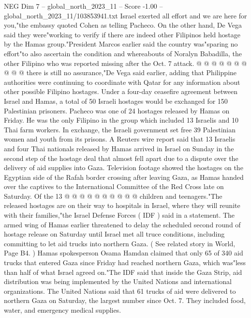 \begin{textsample}{NEG Dim 7 – global\_north\_2023\_11 – Score -1.00 – global\_north\_2023\_11/103853941.txt}
Israel exerted all effort and we are here for you,"the embassy quoted Cohen as telling Pacheco.
On the other hand, De Vega said they were"working to verify if there are indeed other Filipinos held hostage by the Hamas group."President Marcos earlier said the country was"sparing no effort"to also ascertain the condition and whereabouts of Noralyn Babadilla, the other Filipino who was reported missing after the Oct. 7 attack. @ @ @ @ @ @ @ @ @ @ there is still no assurance,"De Vega said earlier, adding that Philippine authorities were continuing to coordinate with Qatar for any information about other possible Filipino hostages.
Under a four-day ceasefire agreement between Israel and Hamas, a total of 50 Israeli hostages would be exchanged for 150 Palestinian prisoners.
Pacheco was one of 24 hostages released by Hamas on Friday.
He was the only Filipino in the group which included 13 Israelis and 10 Thai farm workers.
In exchange, the Israeli government set free 39 Palestinian women and youth from its prisons.
A Reuters wire report said that 13 Israelis and four Thai nationals released by Hamas arrived in Israel on Sunday in the second step of the hostage deal that almost fell apart due to a dispute over the delivery of aid supplies into Gaza.
Television footage showed the hostages on the Egyptian side of the Rafah border crossing after leaving Gaza, as Hamas handed over the captives to the International Committee of the Red Cross late on Saturday.
Of the 13 @ @ @ @ @ @ @ @ @ @ children and teenagers."The released hostages are on their way to hospitals in Israel, where they will reunite with their families,"the Israel Defense Forces ( IDF ) said in a statement.
The armed wing of Hamas earlier threatened to delay the scheduled second round of hostage release on Saturday until Israel met all truce conditions, including committing to let aid trucks into northern Gaza. ( See related story in World, Page B4. ) Hamas spokesperson Osama Hamdan claimed that only 65 of 340 aid trucks that entered Gaza since Friday had reached northern Gaza, which was"less than half of what Israel agreed on."The IDF said that inside the Gaza Strip, aid distribution was being implemented by the United Nations and international organizations.
The United Nations said that 61 trucks of aid were delivered to northern Gaza on Saturday, the largest number since Oct. 7.
They included food, water, and emergency medical supplies.

\end{textsample}
